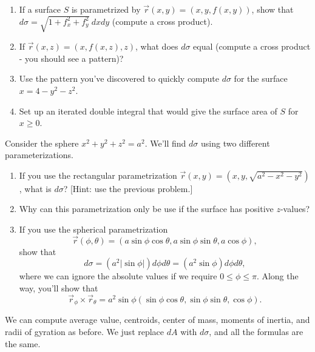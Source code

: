 \begin{problem}
\begin{enumerate}
	\item If a surface $S$ is parametrized by $\vec r(x,y) = (x,y,f(x,y))$, show that $d\sigma = \sqrt{1+f_x^2+f_y^2}\ dxdy$ (compute a cross product).  
	\item If $\vec r(x,z) = (x,f(x,z),z)$, what does $d\sigma$ equal (compute a cross product - you should see a pattern)?
	\item Use the pattern you've discovered to quickly compute $d\sigma$ for the surface $x=4-y^2-z^2$.
	\item Set up an iterated double integral that would give the surface area of $S$ for $x\geq 0$. 
\end{enumerate}
\end{problem}


\begin{problem}\label{sphere surface area element}
 Consider the sphere $x^2+y^2+z^2=a^2$.  We'll find $d\sigma$ using two different parameterizations.
 \begin{enumerate}
  \item If you use the rectangular parametrization $\vec r(x,y) = (x,y,\sqrt{a^2-x^2-y^2})$, what is $d\sigma$? [Hint: use the previous problem.] 
	\item Why can this parametrization only be use if the surface has positive $z$-values?
  \item {} If you use the spherical parametrization $$\vec r(\phi,\theta) = (a\sin\phi\cos\theta,a\sin\phi\sin\theta,a\cos\phi),$$ show that $$d\sigma = (a^2|\sin\phi|)d\phi d\theta= (a^2\sin\phi) d\phi d\theta,$$ where we can ignore the absolute values if we require $0\leq \phi\leq \pi$. Along the way, you'll show that 
$$ \vec r_\phi\times \vec r_\theta = a^2\sin \phi (\sin\phi\cos\theta,\sin\phi\sin\theta,\cos\phi).$$
 \end{enumerate}
\end{problem}

We can compute average value, centroids, center of mass, moments of inertia, and radii of gyration as before.  We just replace $dA$ with $d\sigma$, and all the formulas are the same. 


